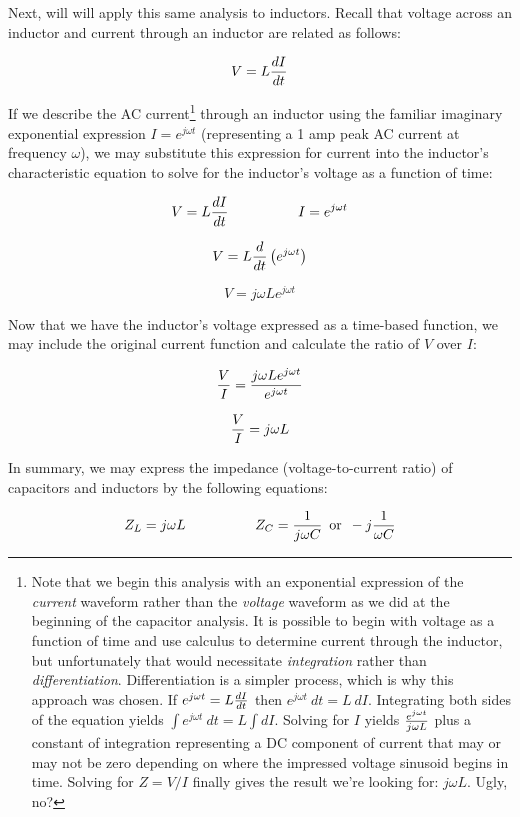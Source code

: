 \vskip 10pt

\filbreak

Next, will will apply this same analysis to inductors.  Recall that voltage across an inductor and current through an inductor are related as follows:

$$V = L {dI \over dt}$$

If we describe the AC current\footnote{Note that we begin this analysis with an exponential expression of the \textit{current} waveform rather than the \textit{voltage} waveform as we did at the beginning of the capacitor analysis.  It is possible to begin with voltage as a function of time and use calculus to determine current through the inductor, but unfortunately that would necessitate \textit{integration} rather than \textit{differentiation}.  Differentiation is a simpler process, which is why this approach was chosen.  If $e^{j \omega t} = L {dI \over dt}$ then $e^{j \omega t} \> dt = L \> dI$.  Integrating both sides of the equation yields $\int e^{j \omega t} \> dt = L \int dI$.  Solving for $I$ yields $e^{j \omega t} \over j \omega L$ plus a constant of integration representing a DC component of current that may or may not be zero depending on where the impressed voltage sinusoid begins in time.  Solving for $Z = V / I$ finally gives the result we're looking for: $j \omega L$.  Ugly, no?} through an inductor using the familiar imaginary exponential expression $I = e^{j \omega t}$ (representing a 1 amp peak AC current at frequency $\omega$), we may substitute this expression for current into the inductor's characteristic equation to solve for the inductor's voltage as a function of time: 

$$V = L {dI \over dt} \hbox{\hskip 50pt} I = e^{j \omega t}$$

$$V = L {d \over dt} \left( e^{j \omega t} \right)$$

$$V = j \omega L e^{j \omega t}$$

Now that we have the inductor's voltage expressed as a time-based function, we may include the original current function and calculate the ratio of $V$ over $I$:

$${V \over I} = {{j \omega L e^{j \omega t}} \over {e^{j \omega t}}}$$

$${V \over I} = j \omega L$$

\vskip 10pt

In summary, we may express the impedance (voltage-to-current ratio) of capacitors and inductors by the following equations:

$$Z_L = j \omega L \hskip 50pt Z_C = {1 \over j \omega C} \hskip 5pt \hbox{or} \hskip 5pt -j {1 \over {\omega C}}$$

